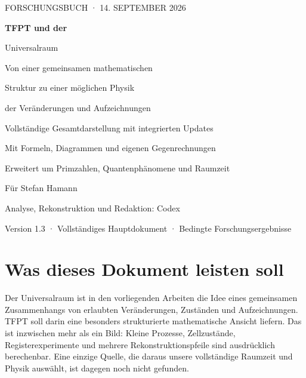 \documentclass[11pt,a4paper,oneside,parskip=half,headings=normal]{scrreprt}
\begin{document}
\hypersetup{pageanchor=false}
\begin{titlepage}
\pagecolor{navy}\color{white}
\vspace*{5mm}
{\sffamily\large FORSCHUNGSBUCH · 14. SEPTEMBER 2026\par}
\vspace{22mm}
{\sffamily\bfseries\fontsize{36}{42}\selectfont TFPT und der\par Universalraum\par}
\vspace{12mm}
{\sffamily\fontsize{17}{23}\selectfont Von einer gemeinsamen mathematischen\par Struktur zu einer möglichen Physik\par der Veränderungen und Aufzeichnungen\par}
\vspace{15mm}
\vfill
{\sffamily\large Vollständige Gesamtdarstellung mit integrierten Updates\par}
\vspace{4mm}
{\sffamily\normalsize Mit Formeln, Diagrammen und eigenen Gegenrechnungen\par Erweitert um Primzahlen, Quantenphänomene und Raumzeit\par}
\vspace{12mm}
{\sffamily\small Für Stefan Hamann\par Analyse, Rekonstruktion und Redaktion: Codex\par}
\vspace{6mm}
{\sffamily\small\color{white!75}Version 1.3 · Vollständiges Hauptdokument · Bedingte Forschungsergebnisse\par}
\end{titlepage}
\nopagecolor\color{black}
\hypersetup{pageanchor=true}
\chapter*{Was dieses Dokument leisten soll}
Der Universalraum ist in den vorliegenden Arbeiten die Idee eines gemeinsamen Zusammenhangs von erlaubten Veränderungen, Zuständen und Aufzeichnungen. TFPT soll darin eine besonders strukturierte mathematische Ansicht liefern. Das ist inzwischen mehr als ein Bild: Kleine Prozesse, Zellzustände, Registerexperimente und mehrere Rekonstruktionspfeile sind ausdrücklich berechenbar. Eine einzige Quelle, die daraus unsere vollständige Raumzeit und Physik auswählt, ist dagegen noch nicht gefunden.
\end{document}
